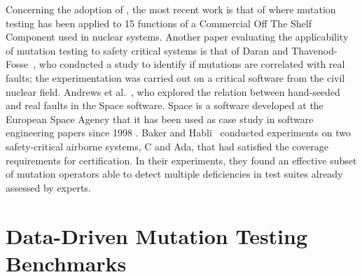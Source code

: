 Concerning the adoption of , the most recent work is that of \cite{delgado2018evaluation} where mutation testing has been applied to 15 functions of a Commercial Off The Shelf Component used in nuclear systems. 
Another paper evaluating the applicability of mutation testing to safety critical systems is that of Daran and Thavenod-Fosse~\cite{daran1996software}, who conducted a study to identify if mutations are correlated with real faults; the experimentation was carried out on a critical software from the civil nuclear field. Andrews et al.~\cite{andrews2005mutation}, who explored the relation between hand-seeded and real faults in the Space software. Space is a software developed at the European Space Agency that it has been used as case study in software engineering papers since 1998 \cite{frankl1998further}.
Baker and Habli~\cite{baker2012empirical} conducted experiments on two safety-critical airborne systems, C and Ada, that had satisfied the coverage requirements for certification. In their experiments, they found an effective subset of mutation operators able to detect multiple deficiencies in test suites already assessed by experts. 







\clearpage

\section{Data-Driven Mutation Testing Benchmarks}
\label{section:industry:data}

